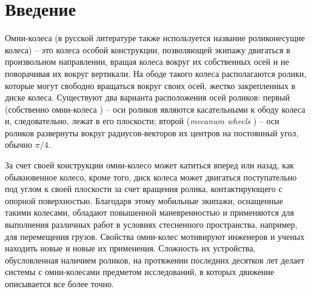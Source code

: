 \section*{Введение}

Омни-колеса (в русской литературе также используется название роликонесущие колеса) -- это колеса особой конструкции, позволяющей экипажу двигаться в произвольном направлении, вращая колеса вокруг их собственных осей и не поворачивая их вокруг вертикали. На ободе такого колеса располагаются ролики, которые могут свободно вращаться вокруг своих осей, жестко закрепленных в диске колеса. Существуют два варианта расположения осей роликов: первый  (собственно омни-колеса \cite{formalskii}) -- оси роликов являются касательными к ободу колеса и, следовательно, лежат в его плоскости; второй (\textit{mecanum wheels} \cite{Ilon}) -- оси роликов развернуты вокруг радиусов-векторов их центров на постоянный угол, обычно $\pi/4$.

За счет своей конструкции омни-колесо может катиться вперед или назад, как обыкновенное колесо, кроме того, диск колеса может двигаться поступательно под углом к своей плоскости за счет вращения ролика, контактирующего с опорной поверхностью. Благодаря этому мобильные экипажи, оснащенные такими колесами, обладают повышенной маневренностью и применяются для выполнения различных работ в условиях стесненного пространства, например, для перемещения грузов.
Свойства омни-колес мотивируют инженеров и ученых находить новые и новые их применения.
Сложность их устройства, обусловленная наличием роликов, на протяжении последних десятков лет делает системы с омни-колесами предметом исследований, в которых движение описывается все более точно.

